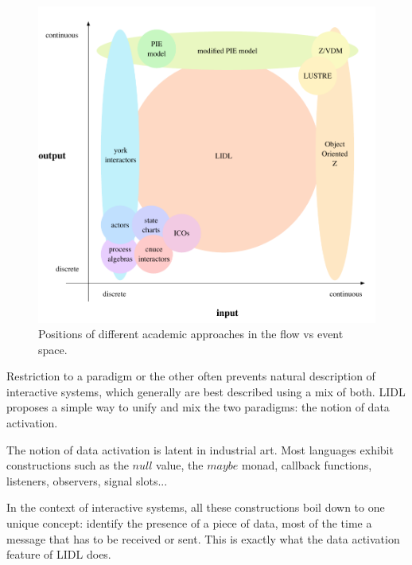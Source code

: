 \documentclass[10pt]{sigplanconf}
\begin{document}
\begin{figure}[h]
\centering
\includegraphics[width=\linewidth,height=\linewidth,keepaspectratio]{figures/discretecontinuous.pdf}
\caption{Positions of different academic approaches in the flow vs event space.}
\label{fig:discreteContinuous}
\end{figure}

Restriction to a paradigm or the other often prevents natural description of interactive systems, which generally are best described using a mix of both. LIDL proposes a simple way to unify and mix the two paradigms: the notion of data activation.

The notion of data activation is latent in industrial art. Most languages exhibit constructions such as the $null$ value, the $maybe$ monad, callback functions, listeners, observers, signal slots...

In the context of interactive systems, all these constructions boil down to one unique concept: identify the presence of a piece of data, most of the time a message that has to be received or sent. This is exactly what the data activation feature of LIDL does.
\end{document}
